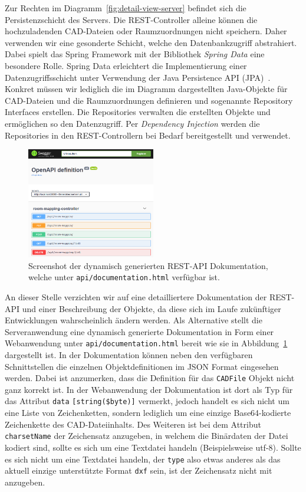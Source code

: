 Zur Rechten im Diagramm~\ref{fig:detail-view-server} befindet sich die Persistenzschicht des Servers.
Die REST-Controller alleine können die hochzuladenden CAD-Dateien oder Raumzuordnungen nicht speichern.
Daher verwenden wir eine gesonderte Schicht, welche den Datenbankzugriff abstrahiert.
Dabei spielt das Spring Framework mit der Bibliothek \textit{Spring Data} eine besondere Rolle.
Spring Data erleichtert die Implementierung einer Datenzugriffsschicht unter Verwendung der Java Persistence API (JPA)~\cite{SpringData}.
Konkret müssen wir lediglich die im Diagramm dargestellten Java-Objekte für CAD-Dateien und die Raumzuordnungen definieren und sogenannte Repository Interfaces erstellen.
Die Repositories verwalten die erstellten Objekte und ermöglichen so den Datenzugriff.
Per \textit{Dependency Injection} werden die Repositories in den REST-Controllern bei Bedarf bereitgestellt und verwendet.

\begin{figure}
    \includegraphics[width=0.5\textwidth]{res/screenshot-docs.png}
    \caption{Screenshot der dynamisch generierten REST-API Dokumentation, welche unter \texttt{api/documentation.html} verfügbar ist.}
    \label{fig:screenshot-docs}
\end{figure}

An dieser Stelle verzichten wir auf eine detailliertere Dokumentation der REST-API und einer Beschreibung der Objekte, da diese sich im Laufe zukünftiger Entwicklungen wahrscheinlich ändern werden.
Als Alternative stellt die Serveranwendung eine dynamisch generierte Dokumentation in Form einer Webanwendung unter \texttt{api/documentation.html} bereit wie sie in Abbildung~\ref{fig:screenshot-docs} dargestellt ist.
In der Dokumentation können neben den verfügbaren Schnittstellen die einzelnen Objektdefinitionen im JSON Format eingesehen werden.
Dabei ist anzumerken, dass die Definition für das \texttt{CADFile} Objekt nicht ganz korrekt ist.
In der Webanwendung der Dokumentation ist dort als Typ für das Attribut \texttt{data} \texttt{[string(\$byte)]} vermerkt, jedoch handelt es sich nicht um eine Liste von Zeichenketten, sondern lediglich um eine einzige Base64-kodierte Zeichenkette des CAD-Dateiinhalts.
Des Weiteren ist bei dem Attribut \texttt{charsetName} der Zeichensatz anzugeben, in welchem die Binärdaten der Datei kodiert sind, sollte es sich um eine Textdatei handeln (Beispielsweise \glqq{}utf-8\grqq{}).
Sollte es sich nicht um eine Textdatei handeln, der \texttt{type} also etwas anderes als das aktuell einzige unterstützte Format \texttt{dxf} sein, ist der Zeichensatz nicht mit anzugeben.

